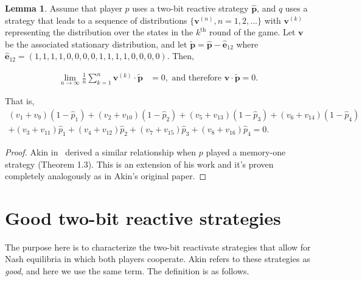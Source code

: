\documentclass{article}
\theoremstyle{definition}
\newtheorem{lemma}[theorem]{Lemma}
\begin{document}
\begin{lemma}\label{lemma:akin_extended}
  Assume that player \(p\) uses a two-bit reactive strategy \(\mathbf{\hat{p}}\),
  and \(q\) uses a strategy that leads to a sequence
  of distributions \(\{\mathbf{v}^{(n)}, n = 1, 2, ...\}\) with
  \(\mathbf{v}^{(k)}\) representing the distribution over the states in the
  \(k^{\text{th}}\) round of the game. Let \(\mathbf{v}\) be the associated
  stationary distribution, and let \(\mathbf{\tilde{p}} = \mathbf{\hat{p}} - \mathbf{\hat{e}}_{1 2}\)
  where \(\mathbf{\hat{e}}_{1 2} = (1, 1, 1, 1, \allowbreak 0,
  0, 0, 0, 1, 1, 1, 1, 0, 0, 0, 0)\). Then,
  \vspace{-.5cm}

  \begin{align*}
    \lim_{n \rightarrow \infty} \frac{1}{n} \sum_{k=1}^{n} \mathbf{v}^{(k)} \cdot\mathbf{\tilde{p}} & = 0, \text{ and therefore } \mathbf{v} \cdot \mathbf{\tilde{p}} = 0.
  \end{align*}

  That is,
  \begin{align}\label{eq:akin_extended}
  (v_{1} + v_{9}) (1 - \hat{p}_1) + (v_{2} + v_{10}) (1 - \hat{p}_2)  + (v_{5} + v_{13}) (1 - \hat{p}_3) + (v_{6} + v_{14}) (1 - \hat{p}_4) \nonumber \\
  + (v_{3} + v_{11})\hat{p}_1  + (v_{4} + v_{12})\hat{p}_2 + (v_{7} + v_{15}) \hat{p}_3 + (v_{8} + v_{16}) \hat{p}_4 = 0.
  \end{align}
\end{lemma}

\begin{proof}
Akin in~\citep{akin:EGADS:2016} derived a similar relationship when \(p\) played 
a memory-one strategy (Theorem 1.3). This is an extension of his work and it's
proven completely analogously as in Akin's original paper.
\end{proof}

\section{Good two-bit reactive strategies}

The purpose here is to characterize the two-bit reactivate strategies that allow
for Nash equilibria in which both players cooperate. Akin refers to these strategies
as \textit{good}, and here we use the same term. The definition is as follows.
\end{document}
